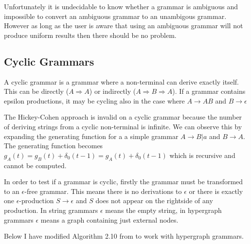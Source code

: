 
Unfortunately it is undecidable to know whether a grammar is ambiguous and impossible to convert an ambiguous grammar to an unambigous grammar. However as long as the user is aware that using an ambiguous grammar will not produce uniform results then there should be no problem.

\subsection{Cyclic Grammars}

A cyclic grammar is a grammar where a non-terminal can derive exactly itself. This can be directly ($A \Rightarrow A$) or indirectly ($A \Rightarrow B \Rightarrow A$). If a grammar contains epsilon productions, it may be cycling also in the case where $A \to AB$ and $B \to \epsilon$

The Hickey-Cohen approach is invalid on a cyclic grammar because the number of deriving strings from a cyclic non-terminal is infinite. We can observe this by expanding the generating function for a a simple grammar $A \to B | a$ and $B \to A$. The generating function becomes $g_A(t) = g_B(t) + \delta_0(t-1) = g_A(t) + \delta_0(t-1)$ which is recursive and cannot be computed.

In order to test if a grammar is cyclic, firstly the grammar must be transformed to an $\epsilon$-free grammar. This means there is no derivations to $\epsilon$ or there is exactly one $\epsilon$-production $S \to \epsilon$ and $S$ does not appear on the rightside of any production. In string grammars $\epsilon$ means the empty string, in hypergraph grammars $\epsilon$ means a graph containing just external nodes.

Below I have modified Algorithm 2.10 from \citet{Aho} to work with hypergraph grammars.

